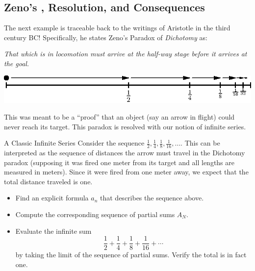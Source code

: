  \subsection{Zeno's , Resolution, and Consequences}\label{infser} 
 
The next example is traceable back to the writings of Aristotle in the third century BC!  Specifically, he states Zeno's Paradox of \emph{Dichotomy} as: \begin{center}
\emph{That which is in locomotion must arrive at the half-way stage before it arrives at the goal.}
\end{center}

	\begin{center}
		\includegraphics[width=400pt]{ChapterSeqSer/Figures/zeno.eps}
	\end{center}

This was meant to be a ``proof'' that an object (say an arrow in flight) could never reach its target.  This paradox is resolved with our notion of infinite series. 

\begin{exercise}{A Classic Infinite Series \Coffeecup \Coffeecup}
Consider the sequence $\frac{1}{2},\frac{1}{4},\frac{1}{8},\frac{1}{16},\ldots$.  This can be interpreted as the sequence of distances the arrow must travel in the Dichotomy paradox (supposing it was fired one meter from its target and all lengths are measured in meters).  Since it were fired from one meter away, we expect that the total distance traveled is one.

\begin{itemize}
\item Find an explicit formula $a_n$ that describes the sequence above.
\vspace*{.5in}
\item Compute the corresponding sequence of partial sums $A_N$. 
\vspace*{.5in}
\item Evaluate the infinite sum $$\frac{1}{2}+\frac{1}{4}+\frac{1}{8}+\frac{1}{16}+\cdots $$
by taking the limit of the sequence of partial sums.  Verify the total is in fact one.
\vspace*{1in}
\end{itemize}
\end{exercise}

